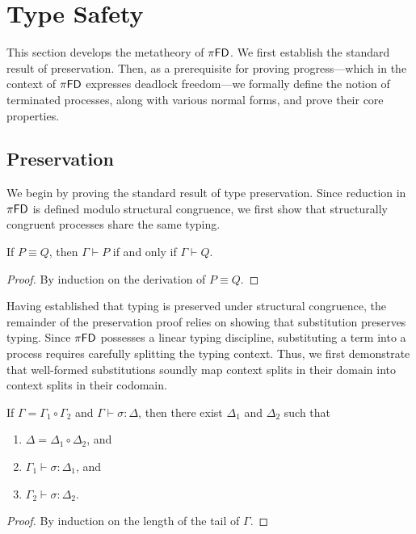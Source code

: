 \chapter{Type Safety}\label{ch:type-safety}

This section develops the metatheory of $\pi\textsf{FD}$. We first establish the
standard result of preservation. Then, as a prerequisite for proving progress---which
in the context of $\pi\textsf{FD}$ expresses deadlock freedom---we formally define
the notion of terminated processes, along with various normal forms, and prove
their core properties.

\section{Preservation}
We begin by proving the standard result of type preservation. Since reduction
in $\pi\textsf{FD}$ is defined modulo structural congruence, we first show that
structurally congruent processes share the same typing.

\begin{lemma} \label{lemma:preservation-for-struct-cong}
  If $P \equiv Q$, then $\Gamma \vdash P$ if and only if $\Gamma \vdash Q$.
\end{lemma}
\begin{proof}
  By induction on the derivation of $P \equiv Q$.
\end{proof}

Having established that typing is preserved under structural congruence,
the remainder of the preservation proof relies on showing that substitution
preserves typing. Since $\pi\textsf{FD}$ possesses a linear typing discipline, substituting
a term into a process requires carefully splitting the typing context.
Thus, we first demonstrate that well-formed substitutions soundly map context
splits in their domain into context splits in their codomain.

\begin{lemma} \label{lemma:subst-partition}
  If $\Gamma = \Gamma_1 \circ \Gamma_2$ and $\Gamma \vdash \sigma : \Delta$, then
  there exist $\Delta_1$ and $\Delta_2$ such that
  \begin{enumerate}[label=(\roman*)]
    \item $\Delta = \Delta_1 \circ \Delta_2$, and
    \item $\Gamma_1 \vdash \sigma : \Delta_1$, and
    \item $\Gamma_2 \vdash \sigma : \Delta_2$.
  \end{enumerate}
\end{lemma}
\begin{proof}
  By induction on the length of the tail of $\Gamma$.
\end{proof}

